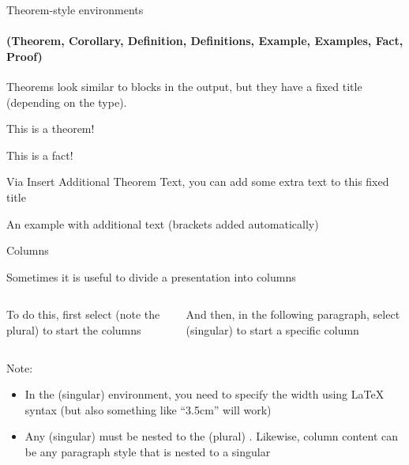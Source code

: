 \documentclass[english]{beamer}
\begin{document}
%
\begin{frame}{Theorem-style environments}

\framesubtitle{(Theorem, Corollary, Definition, Definitions, Example, Examples,
Fact, Proof)}

Theorems look similar to blocks in the output, but they have a fixed
title (depending on the type). 
\begin{theorem}
This is a theorem!
\end{theorem}

\begin{fact}
This is a fact!
\end{fact}


\pause{}

Via \alert{Insert \textrightarrow Additional Theorem Text}, you can add
some extra text to this fixed title
\begin{example}

An example with additional text (brackets added automatically)
\end{example}

\end{frame}
%
\begin{frame}{Columns}

Sometimes it is useful to divide a presentation into columns
\begin{columns}[t]


To do this, first select  (note the plural) to
start the columns

\pause{}


And then, in the following paragraph, select  (singular)
to start a specific column
\end{columns}


\pause{}

\medskip{}

Note:
\begin{itemize}
\item In the  (singular) environment, you need to specify
the width using \LaTeX{} syntax (but also something like ``3.5cm''
will work)
\item Any (singular)  must be nested to the (plural)
. Likewise, column content can be any paragraph
style that is nested to a singular 
\end{itemize}
\end{frame}
\end{document}
